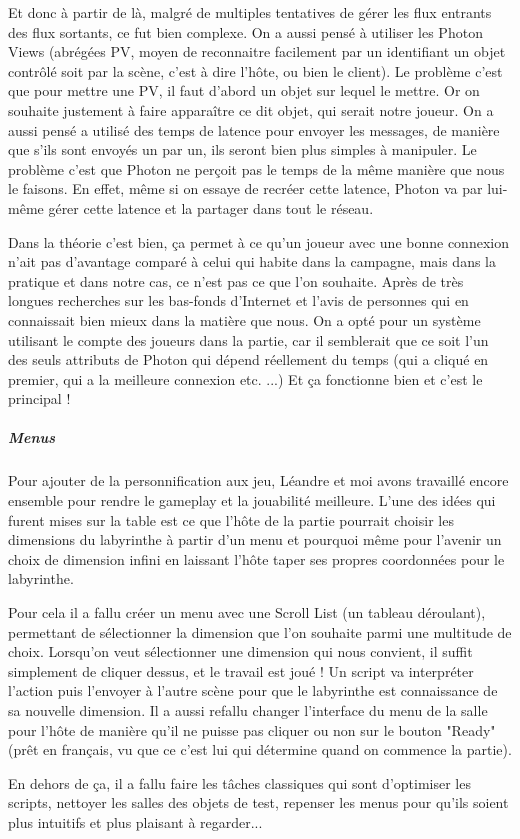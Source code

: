 \documentclass{article}
\begin{document}
Et donc à partir de là, malgré de multiples tentatives de gérer les flux entrants des flux sortants, ce fut bien complexe. On a aussi pensé à utiliser les Photon Views (abrégées PV, moyen de reconnaitre facilement par un identifiant un objet contrôlé soit par la scène, c'est à dire l'hôte, ou bien le client). Le problème c'est que pour mettre une PV, il faut d'abord un objet sur lequel le mettre. Or on souhaite justement à faire apparaître ce dit objet, qui serait notre joueur.   
On a aussi pensé a utilisé des temps de latence pour envoyer les messages, de manière que s'ils sont envoyés un par un, ils seront bien plus simples à manipuler. Le problème c'est que Photon ne perçoit pas le temps de la même manière que nous le faisons. En effet, même si on essaye de recréer cette latence, Photon va par lui-même gérer cette latence et la partager dans tout le réseau. 

Dans la théorie c'est bien, ça permet à ce qu'un joueur avec une bonne connexion n'ait pas d'avantage comparé à celui qui habite dans la campagne, mais dans la pratique et dans notre cas, ce n'est pas ce que l'on souhaite. Après de très longues recherches sur les bas-fonds d'Internet et l'avis de personnes qui en connaissait bien mieux dans la matière que nous. On a opté pour un système utilisant le compte des joueurs dans la partie, car il semblerait que ce soit l'un des seuls attributs de Photon qui dépend réellement du temps (qui a cliqué en premier, qui a la meilleure connexion etc. ...) Et ça fonctionne bien et c'est le principal !


\subparagraph{Menus}

Pour ajouter de la personnification aux jeu, Léandre et moi avons travaillé encore ensemble pour rendre le gameplay et la jouabilité meilleure. L'une des idées qui furent mises sur la table est ce que l'hôte de la partie pourrait choisir les dimensions du labyrinthe à partir d’un menu et pourquoi même pour l'avenir un choix de dimension infini en laissant l'hôte taper ses propres coordonnées pour le labyrinthe. 

Pour cela il a fallu créer un menu avec une Scroll List (un tableau déroulant), permettant de sélectionner la dimension que l'on souhaite parmi une multitude de choix. Lorsqu'on veut sélectionner une dimension qui nous convient, il suffit simplement de cliquer dessus, et le travail est joué ! Un script va interpréter l'action puis l'envoyer à l'autre scène pour que le labyrinthe est connaissance de sa nouvelle dimension. Il a aussi refallu changer l'interface du menu de la salle pour l'hôte de manière qu'il ne puisse pas cliquer ou non sur le bouton "Ready" (prêt en français, vu que ce c'est lui qui détermine quand on commence la partie).
 
En dehors de ça, il a fallu faire les tâches classiques qui sont d'optimiser les scripts, nettoyer les salles des objets de test, repenser les menus pour qu'ils soient plus intuitifs et plus plaisant à regarder...




\end{document}
